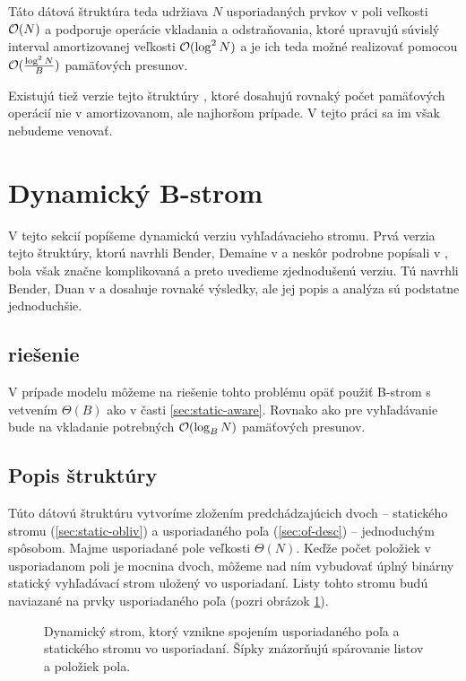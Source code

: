 Táto dátová štruktúra teda udržiava $N$ usporiadaných prvkov v poli veľkosti $\mathcal{O}(N)$ a podporuje operácie vkladania a odstraňovania, ktoré upravujú súvislý interval amortizovanej veľkosti $\mathcal{O}(\log^2{N})$ a je ich teda možné realizovať pomocou $\mathcal{O}(\frac{\log^2{N}}{B})$ pamäťových presunov.

Existujú tiež verzie tejto štruktúry \citep{bender2002ofworstcase}, ktoré dosahujú rovnaký počet pamäťových operácií nie v amortizovanom, ale najhoršom prípade. V tejto práci sa im však nebudeme venovať.

\section{Dynamický B-strom} \label{sec:dynamic-obliv}
V tejto sekcií popíšeme dynamickú verziu \obliv vyhľadávacieho stromu. Prvá verzia tejto štruktúry, ktorú navrhli Bender, Demaine \etal v \citep{btreeshort} a neskôr podrobne popísali v \citep{btreefull}, bola však značne komplikovaná a preto uvedieme zjednodušenú verziu. Tú navrhli Bender, Duan \etal v \citep{bender2002} a dosahuje rovnaké výsledky, ale jej popis a analýza sú podstatne jednoduchšie.

\subsection{\Aware riešenie}
V prípade \aware modelu môžeme na riešenie tohto problému opäť použiť B-strom s vetvením $\Theta(B)$ ako v časti \ref{sec:static-aware}. Rovnako ako pre vyhľadávanie bude na vkladanie potrebných $\mathcal{O}(\log_B{N})$ pamäťových presunov.

\subsection{Popis \obliv štruktúry}
Túto dátovú štruktúru vytvoríme zložením predchádzajúcich dvoch -- statického stromu (\ref{sec:static-obliv}) a usporiadaného poľa (\ref{sec:of-desc}) -- jednoduchým spôsobom. Majme usporiadané pole veľkosti $\Theta(N)$. Keďže počet položiek v usporiadanom poli je mocnina dvoch, môžeme nad ním vybudovať úplný binárny statický vyhľadávací strom uložený vo  usporiadaní. Listy tohto stromu budú naviazané na prvky usporiadaného poľa (pozri obrázok \ref{fig:cobtree_overview}).

\begin{figure}
    \centering
    \resizebox{\textwidth}{!}{
        
    }
    \caption[Dynamický strom]{Dynamický strom, ktorý vznikne spojením usporiadaného poľa a statického stromu vo  usporiadaní. Šípky znázorňujú spárovanie listov a položiek pola.}
    \label{fig:cobtree_overview}
\end{figure}

